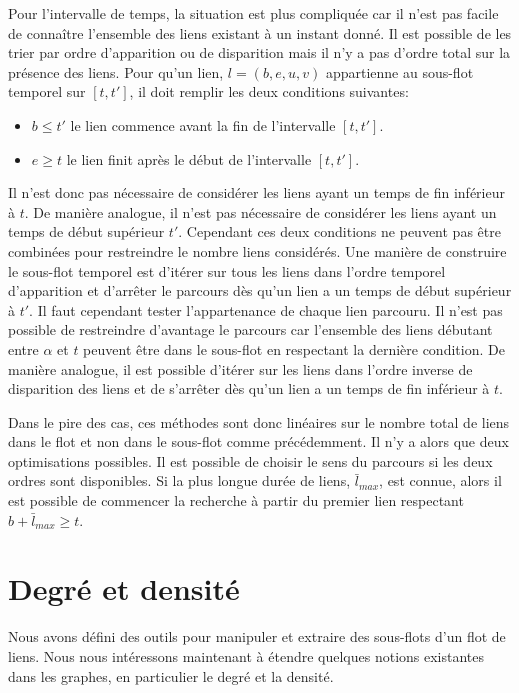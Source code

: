 Pour l'intervalle de temps, la situation est plus compliquée car il n'est pas facile de connaître l'ensemble des liens existant à un instant donné.
Il est possible de les trier par ordre d'apparition ou de disparition mais il n'y a pas d'ordre total sur la présence des liens.
Pour qu'un lien, $l= (b,e,u,v)$ appartienne au sous-flot temporel sur $[t,t']$, il doit remplir les deux conditions suivantes:
\begin{itemize}
\item \textbf{$b \leq t'$} le lien commence avant la fin de l'intervalle $[t,t']$.
\item \textbf{$e \geq t$} le lien finit après le début de l'intervalle $[t,t']$.
\end{itemize}


Il n'est donc pas nécessaire de considérer les liens ayant un temps de fin inférieur à $t$.
De manière analogue, il n'est pas nécessaire de considérer les liens ayant un temps de début supérieur $t'$.
Cependant ces deux conditions ne peuvent pas être combinées pour restreindre le nombre liens considérés.
Une manière de construire le sous-flot temporel est d'itérer sur tous les liens dans l'ordre temporel d'apparition et d'arrêter le parcours dès qu'un lien a un temps de début supérieur à $t'$.
Il faut cependant tester l'appartenance de chaque lien parcouru.
Il n'est pas possible de restreindre d'avantage le parcours car l'ensemble des liens débutant entre $\alpha$ et $t$ peuvent être dans le sous-flot en respectant la dernière condition.
De manière analogue, il est possible d'itérer sur les liens dans l'ordre inverse de disparition des liens et de s'arrêter dès qu'un lien a un temps de fin inférieur à $t$.


Dans le pire des cas, ces méthodes sont donc linéaires sur le nombre total de liens dans le flot et non dans le sous-flot comme précédemment.
Il n'y a alors que deux optimisations possibles.
Il est possible de choisir le sens du parcours si les deux ordres sont disponibles.
Si la plus longue durée de liens, $\bar{l}_{max}$, est connue, alors il est possible de commencer la recherche à partir du premier lien respectant $b+\bar{l}_{max} \geq t$.



\section{Degré et densité}
\label{sec:def_densite}
Nous avons défini des outils pour manipuler et extraire des sous-flots d'un flot de liens.
Nous nous intéressons maintenant à étendre quelques notions existantes dans les graphes, en particulier le degré et la densité.


